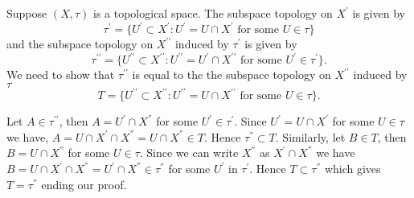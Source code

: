 
\begin{solution}
    Suppose $(X,\tau)$ is a topological space.
The subspace topology on $X^{\prime}$ is given by
$$\tau^{\prime}=\{U^{\prime}\subset X^{\prime}:
U^\prime = U\cap X^\prime\text{ for some }U\in\tau\}$$
and the subspace topology on $X^{\prime\prime}$
induced by $\tau^\prime$ is given by
$$\tau^{\prime\prime}=\{U^{\prime\prime}\subset
X^{\prime\prime}:U^{\prime\prime} = U^\prime\cap
X^{\prime\prime}\text{ for some }U^\prime\in\tau^\prime\}.$$
We need to show that $\tau^{\prime\prime}$ is equal to the
the subspace topology on $X^{\prime\prime}$ induced by
$\tau$
$$T=\{U^{\prime\prime}\subset
X^{\prime\prime}:U^{\prime\prime} = U\cap
X^{\prime\prime}\text{ for some }U\in\tau\}.$$

Let $A\in \tau^{\prime\prime}$, then $A=U^\prime\cap
X^{\dprime}$ for some $U^\prime\in\tau^\prime$. Since
$U^\prime=U\cap X^\prime$ for some $U\in\tau$ we have,
$A=U\cap X^\prime\cap X^\dprime=U\cap X^\dprime
\in T$. Hence $\tau^\dprime\subset T$. Similarly,
let $B\in T$, then $B=U\cap X^\dprime$ for some $U\in
\tau$. Since we can write $X^\dprime$ as $X^\prime\cap
X^\dprime$ we have $B=U\cap X^\prime\cap X^\dprime=
U^\prime\cap X^\dprime\in \tau^\dprime$ for some $U^\prime
$ in $\tau^\prime$. Hence $T\subset \tau^\dprime$ which
gives $T=\tau^\dprime$ ending our proof.
\end{solution}
